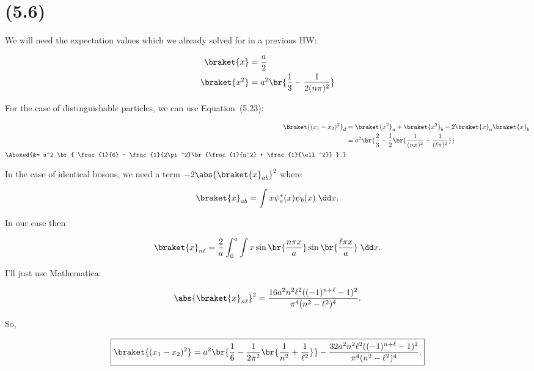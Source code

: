 \section{(5.6)}

We will need the expectation values which we already solved for in a previous HW:

\begin{align}
  \braket{x} &= \frac{a}{2} \\
  \braket{x^2} &= a^2 \br{\frac{1}{3} - \frac{1}{2(n\pi)^2}}
\end{align}


\begin{parts}
\item For the case of distinguishable particles, we can use Equation~(5.23):

  \begin{align}
    \Braket{(x_1-x_2)^2}_d &= \braket{x^2}_a + \braket{x^2}_b - 2\braket{x}_a\braket{x}_b \\
                           &= a^2 \br{ \frac{2}{3} - \frac{1}{2} \br{\frac{1}{(n\pi)^2} + \frac{1}{(\ell\pi)^2}}} \\
                           \Aboxed{&= a^2 \br{ \frac{1}{6} - \frac{1}{2\pi^2}\br{\frac{1}{n^2} + \frac{1}{\ell^2}} }.}
  \end{align}


\item In the case of identical bosons, we need a term $-2\abs{\braket{x}_{ab}}^2$ where

  \begin{equation}
    \braket{x}_{ab} = \int x \psi^*_a(x)\psi_b(x) \;\dd x.
  \end{equation}

  In our case then

  \begin{equation}
    \braket{x}_{n\ell} = \frac{2}{a} \int_0^a \int x \sin\br{\frac{n \pi x}{a}} \sin\br{\frac{\ell \pi x}{a}} \;\dd x.
  \end{equation}

  I'll just use Mathematica:

  \begin{equation}
    \abs{\braket{x}_{n\ell}}^2 = \frac{16a^2 n^2 \ell^2((-1)^{n+\ell} - 1)^2 }{\pi^4(n^2 - \ell^2)^4}.
  \end{equation}

  So,

  \begin{equation}
    \boxed{\braket{(x_1 - x_2)^2} = a^2 \br{ \frac{1}{6} - \frac{1}{2\pi^2}\br{\frac{1}{n^2} + \frac{1}{\ell^2}} } - \frac{32a^2 n^2 \ell^2((-1)^{n+\ell} - 1)^2 }{\pi^4(n^2 - \ell^2)^4}.}
  \end{equation}



\end{parts}
